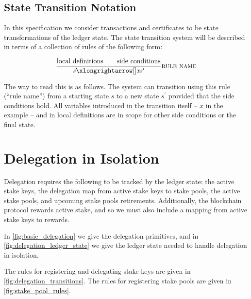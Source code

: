 \documentclass[11pt,a4paper]{article}
\newcommand{\var}[1]{\mathit{#1}}
\newcommand{\transitionarrow}[2]{\xlongrightarrow[\textsc{#1}]{#2}}
\begin{document}
\subsection{State Transition Notation}

In this specification we consider transactions and certificates to be
state transformations of the ledger state.
The state transition system will be described in terms of a collection of
rules of the following form:

%
\begin{equation*}
\frac{
  \text{local definitions} \qquad  \text{side conditions}
}{
  \var{s}
  \transitionarrow{}{\var{x}}
  \var{s}^\prime
}
\textsc{rule name}
\end{equation*}
%

The way to read this is as follows. The system can transition using this rule
(``rule name'') from a starting state $s$ to a new state $s^\prime$ provided
that the side conditions hold. All variables introduced in the transition
itself -- $x$ in the example -- and in local definitions are in scope for
other side conditions or the final state.

\section{Delegation in Isolation}

Delegation requires the following to be tracked by the ledger state:
the active stake keys, the delegation map from active stake keys to stake pools,
the active stake pools, and upcoming stake pools retirements.
Additionally, the blockchain protocol rewards active stake, and so we must
also include a mapping from active stake keys to rewards.

In \cref{fig:basic_delegation} we give the delegation primitives, and in
\cref{fig:delegation_ledger_state} we give the ledger state needed to handle
delegation in isolation.

The rules for registering and delegating stake keys are given in \cref{fig:delegation_transitions}.
The rules for registering stake pools are given in \cref{fig:stake_pool_rules}.
\end{document}
